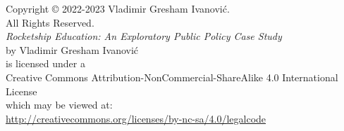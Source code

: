 
\begin{vplace}[1]
\footnotesize
    \begin{center}
        Copyright © 2022-2023 Vladimir Gresham Ivanović.\\
        All Rights Reserved.\\\bigskip\bigskip
        \textit{Rocketship Education: An Exploratory Public Policy Case Study}\\
        by Vladimir Gresham Ivanović\\
        is licensed under a \\
        Creative Commons Attribution-NonCommercial-ShareAlike 4.0 International License\\
        which may be viewed at:\\
        \url{http://creativecommons.org/licenses/by-nc-sa/4.0/legalcode}
    \end{center}
 \end{vplace}
 
